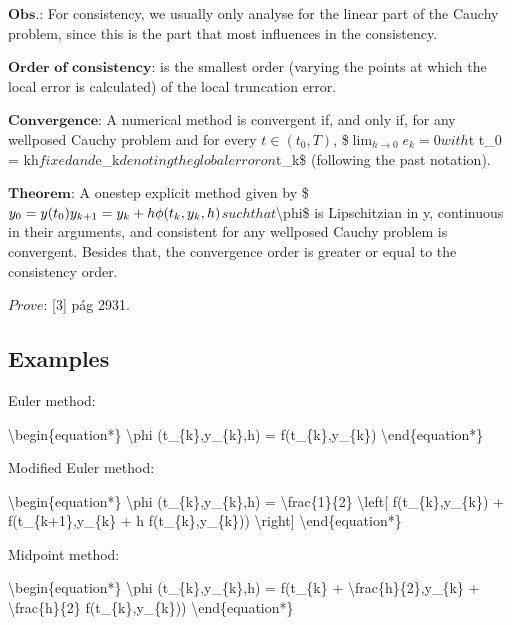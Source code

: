 \documentclass[letterpaper,10pt,english]{jupyterBook}
\begin{document}
\sphinxAtStartPar
\(\textbf{Obs.:}\) For consistency, we usually only analyse for the linear part of the Cauchy problem, since this is the part that most influences in the consistency.

\sphinxAtStartPar
\(\textbf{Order of consistency:}\) is the smallest order (varying the points at which the local error is calculated) of the local truncation error.

\sphinxAtStartPar
\(\textbf{Convergence:}\) A numerical method is convergent if, and only if, for any well\sphinxhyphen{}posed Cauchy problem and for every \(t \in (t_0, T)\),
\$\(\lim_{h \to 0} e_k = 0\)\(
with \)t \sphinxhyphen{} t\_0 = kh\( fixed and \)e\_k\( denoting the global error on \)t\_k\$ (following the past notation).

\sphinxAtStartPar
\(\textbf{Theorem:}\) A one\sphinxhyphen{}step explicit method given by
\$\(
y_0 = y(t_0) \\
y_{k+1} = y_{k} + h \phi (t_{k},y_{k},h)
\)\(
such that \)\textbackslash{}phi\$ is Lipschitzian in y, continuous in their arguments, and consistent for any well\sphinxhyphen{}posed Cauchy problem is convergent. Besides that, the convergence order is greater or equal to the consistency order.

\sphinxAtStartPar
\(\textit{Prove:}\) {[}3{]} pág 29\sphinxhyphen{}31.


\subsection{Examples}
\label{\detokenize{cap2:examples}}
\sphinxAtStartPar
Euler method:

\sphinxAtStartPar
\textbackslash{}begin\{equation*\}
\textbackslash{}phi (t\_\{k\},y\_\{k\},h) = f(t\_\{k\},y\_\{k\})
\textbackslash{}end\{equation*\}

\sphinxAtStartPar
Modified Euler method:

\sphinxAtStartPar
\textbackslash{}begin\{equation*\}
\textbackslash{}phi (t\_\{k\},y\_\{k\},h) = \textbackslash{}frac\{1\}\{2\} \textbackslash{}left{[} f(t\_\{k\},y\_\{k\}) + f(t\_\{k+1\},y\_\{k\} + h f(t\_\{k\},y\_\{k\})) \textbackslash{}right{]}
\textbackslash{}end\{equation*\}

\sphinxAtStartPar
Midpoint method:

\sphinxAtStartPar
\textbackslash{}begin\{equation*\}
\textbackslash{}phi (t\_\{k\},y\_\{k\},h) = f(t\_\{k\} + \textbackslash{}frac\{h\}\{2\},y\_\{k\} + \textbackslash{}frac\{h\}\{2\} f(t\_\{k\},y\_\{k\}))
\textbackslash{}end\{equation*\}
\end{document}
